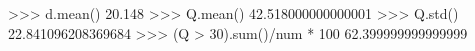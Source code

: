 
>>> d.mean()
20.148
>>> Q.mean()
42.518000000000001
>>> Q.std()
22.841096208369684
>>> (Q > 30).sum()/num * 100
62.399999999999999

